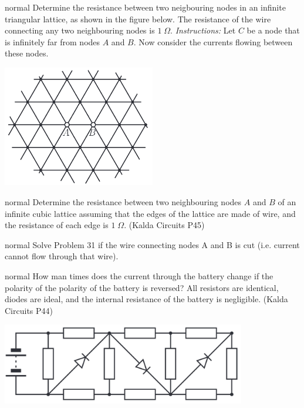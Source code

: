 \hypertarget{P31}{}
\begin{solution}{normal} %
Determine the resistance between two neigbouring nodes in an infinite triangular lattice, as shown in the figure below. The resistance of the wire connecting any two neighbouring nodes is $1\;\Omega$. \textit{Instructions:} Let $C$ be a node that is infinitely far from nodes $A$ and $B$. Now consider the currents flowing between these nodes.
\begin{center}
    \includegraphics[width=0.5\textwidth]{S1 Figures/S1-31.png}
\end{center}
\end{solution}

\hypertarget{P32}{}
\begin{solution}{normal} %
Determine the resistance between two neighbouring nodes $A$ and $B$ of an infinite cubic lattice assuming that the edges of the lattice are made of wire, and the resistance of each edge is $1\;\Omega$. (Kalda Circuits P45)
\end{solution}

\hypertarget{P33}{}
\begin{solution}{normal} %
Solve Problem 31 if the wire connecting nodes A and B is cut (i.e. current cannot flow through that wire).
\end{solution}

\hypertarget{P34}{}
\begin{solution}{normal} %
How man times does the current through the battery change if the polarity of the polarity of the battery is reversed? All resistors are identical, diodes are ideal, and the internal resistance of the battery is negligible. (Kalda Circuits P44)
\begin{center}
    \includegraphics[width=0.8\textwidth]{S1 Figures/S1-34.png}
\end{center}
\end{solution}

